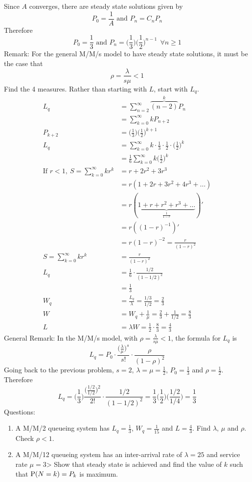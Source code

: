 \documentclass[12pt]{article}
\begin{document}
Since $A$ converges, there are steady state solutions given by $$ P_0 = \frac{1}{A} \text{ and } P_n = C_nP_n $$ 
Therefore $$P_0 = \frac{1}{3} \text{ and } P_n = \Big(\frac{1}{3})\Big(\frac{1}{2}\Big)^{n-1} ~~\forall n \geq 1 $$ 
Remark: For the general M/M/s model to have steady state solutions, it must be the case that $$\rho = \frac{\lambda}{s\mu} < 1 $$ 
Find the 4 measures. Rather than starting with $L$, start with $L_q$. 
$$\begin{aligned} L_q &= \sum_{n = 2}^\infty \overbrace{(n-2)}^kP_n \\ &= \sum_{k=0}^\infty kP_{n+2} \\ P_{k+2} &= \Big(\frac{1}{3}\Big)\Big(\frac{1}{2}\Big)^{k+1} \\ L_q &= \sum_{k=0}^\infty k\cdot \frac{1}{3} \cdot \frac{1}{2} \cdot \Big( \frac{1}{2} \Big)^k \\ &= \frac{1}{6} \sum_{k=0}^\infty k\Big(\frac{1}{2}\Big)^k \\ \text{If } r< 1, ~ S = \sum_{k=0}^\infty kr^k &= r + 2r^2 + 3r^3 \\ &= r(1 + 2r + 3r^2 + 4r^3 + \dots) \\ &= r(\underbrace{1 + r + r^2 + r^3 + \dots}_{\frac{1}{1-r}})' \\ &= r((1-r)^{-1})' \\ &= r(1-r)^{-2} = \frac{r}{(1-r)^2} \\ S = \sum_{k=0}^\infty kr^k &= \frac{r}{(1-r)^2} \\ L_q &= \frac{1}{6} \cdot \frac{1/2}{(1-1/2)^2} \\ &= \frac{1}{3} \\ W_q &= \frac{L_q}{\lambda} = \frac{1/3}{1/2} = \frac{2}{3} \\ W &= W_q + \frac{1}{\mu} = \frac{2}{3} + \frac{1}{1/2} = \frac{8}{3} \\ L &= \lambda W = \frac{1}{2} \cdot \frac{8}{3} = \frac{4}{3} \end{aligned} $$ 
General Remark: In the M/M/s model, with $\rho  = \frac{\lambda}{s\mu} < 1$, the formula for $L_q$ is $$L_q = P_0 \cdot \frac{ \Big( \frac{\lambda}{\mu} \Big)^s}{s!} \cdot \frac{\rho}{(1-\rho)^2} $$ 
Going back to the previous problem, $s=2$, $\lambda = \mu = \frac{1}{2}$, $P_0 = \frac{1}{3}$ and $\rho = \frac{1}{2}$. Therefore 
$$ L_q = \Big( \frac{1}{3} \Big) \frac{ \Big( \frac{1/2}{1/2} \Big)^2}{2!} \cdot \frac{1/2}{(1 - 1/2)^2} = \frac{1}{3} \Big( \frac{1}{2} \Big) \Big( \frac{1/2}{1/4}\Big) = \frac{1}{3} $$ 
Questions: \begin{enumerate} 
\item A M/M/2 queueing system has $L_q = \frac{1}{3}$, $W_q = \frac{1}{15}$ and $L = \frac{4}{3}$. Find $\lambda$, $\mu$ and $\rho$. Check $\rho < 1$. 
\item A M/M/12 queueing system has an inter-arrival rate of $\lambda = 25$ and service rate $\mu = 3$> Show that steady state is achieved and find the value of $k$ such that $\mathrm{P}( N = k ) = P_k$ is maximum. 
\end{enumerate} 
\end{document}
